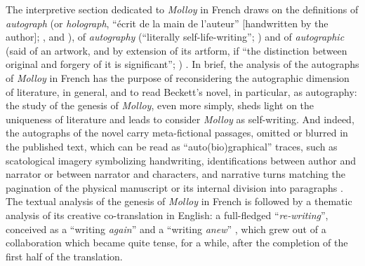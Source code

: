 \begin{paper}
The interpretive section dedicated to \emph{Molloy} in French draws on
the definitions of \emph{autograph} (or \emph{holograph}, ``écrit de la
main de l'auteur'' {[}handwritten by the author{]}; \citealt[241]{gresillon_elements_1994},
and \citealt[271]{kline_guide_1998}), of \emph{autography} (``literally
self-life-writing''; \citealt[x]{abbott_beckett_1996}) and of \emph{autographic} (said of
an artwork, and by extension of its artform, if ``the distinction
between original and forgery of it is significant''; \citealt[113]{goodman_languages_1968}) \citep[qtd. in][25--26]{oreilly_making_2017}. In brief, the analysis of the
autographs of \emph{Molloy} in French has the purpose of reconsidering the
autographic dimension of literature, in general, and to read Beckett's
novel, in particular, as autography: the study of the genesis of
\emph{Molloy}, even more simply, sheds light on the uniqueness of
literature and leads to consider \emph{Molloy} as self-writing. And
indeed, the autographs of the novel carry meta-fictional passages,
omitted or blurred in the published text, which can be read as
``auto(bio)graphical'' traces, such as scatological imagery symbolizing
handwriting, identifications between author and narrator or between
narrator and characters, and narrative turns matching the pagination of
the physical manuscript or its internal division into paragraphs \citep[149--51, 167--68, 185 and 236--37]{oreilly_making_2017}. The textual
analysis of the genesis of \emph{Molloy} in French is followed by a
thematic analysis of its creative co-translation in English: a
full-fledged ``\emph{re-writing}'', conceived as a ``writing
\emph{again}'' and a ``writing \emph{anew}'' \citep[338]{oreilly_making_2017}, which grew out of a collaboration which became quite tense, for a
while, after the completion of the first half of the translation.


\end{paper}
